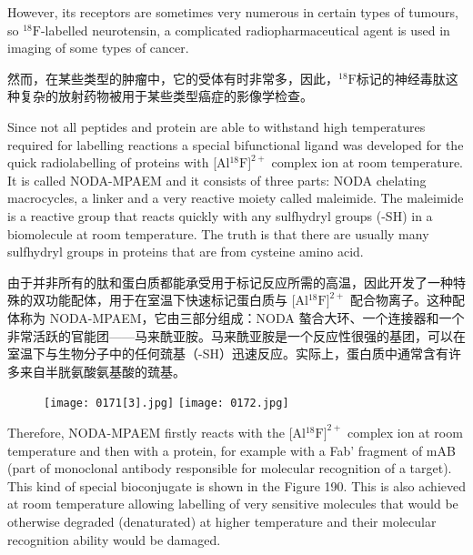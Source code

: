 \documentclass[dvipsnames, svgnames,a4paper,11pt]{article}
\begin{document}
However, its receptors are sometimes very numerous in certain types of tumours, so
${}^\mathrm{18}\mathrm{F}$-labelled neurotensin, a complicated radiopharmaceutical agent is used in
imaging of some types of cancer.

然而，在某些类型的肿瘤中，它的受体有时非常多，因此，${}^\mathrm{18}\mathrm{F}$标记的神经毒肽这种复杂的放射药物被用于某些类型癌症的影像学检查。

Since not all peptides and protein are able to withstand high temperatures required
for labelling reactions a special bifunctional ligand was developed for the quick
radiolabelling of proteins with [Al${}^\mathrm{18}\mathrm{F}]^{2+}$ complex ion at room temperature. It is called
NODA-MPAEM and it consists of three parts: NODA chelating macrocycles, a linker
and a very reactive moiety called maleimide. The maleimide is a reactive group that
reacts quickly with any sulfhydryl groups (-SH) in a biomolecule at room temperature.
The truth is that there are usually many sulfhydryl groups in proteins that are from
cysteine amino acid.

由于并非所有的肽和蛋白质都能承受用于标记反应所需的高温，因此开发了一种特殊的双功能配体，用于在室温下快速标记蛋白质与 [Al${}^\mathrm{18}\mathrm{F}]^{2+}$ 配合物离子。这种配体称为 NODA-MPAEM，它由三部分组成：NODA 螯合大环、一个连接器和一个非常活跃的官能团——马来酰亚胺。马来酰亚胺是一个反应性很强的基团，可以在室温下与生物分子中的任何巯基（-SH）迅速反应。实际上，蛋白质中通常含有许多来自半胱氨酸氨基酸的巯基。

\begin{figure}[h]
	\centering
    \texttt{[image: 0171[3].jpg]}   
    \texttt{[image: 0172.jpg]}   
     \label{fig190}
\end{figure}

Therefore, NODA-MPAEM firstly reacts with the [Al${}^\mathrm{18}\mathrm{F}]^{2+}$ complex ion at room
temperature and then with a protein, for example with a Fab’ fragment of mAB (part
of monoclonal antibody responsible for molecular recognition of a target). This kind
of special bioconjugate is shown in the Figure 190. This is also achieved at room
temperature allowing labelling of very sensitive molecules that would be otherwise
degraded (denaturated) at higher temperature and their molecular recognition ability
would be damaged.
\end{document}
